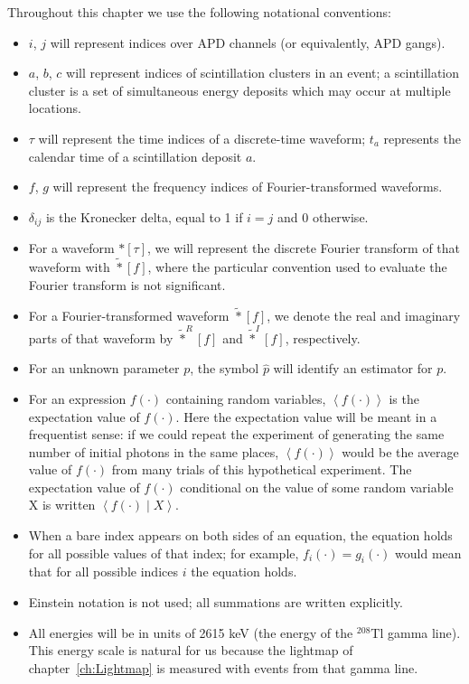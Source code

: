 Throughout this chapter we use the following notational conventions:
\begin{itemize}
\item $i$, $j$ will represent indices over APD channels (or equivalently, APD gangs).
\item $a$, $b$, $c$ will represent indices of scintillation clusters in an event; a scintillation cluster is a set of simultaneous energy deposits which may occur at multiple locations.
\item $\tau$ will represent the time indices of a discrete-time waveform; $t_a$ represents the calendar time of a scintillation deposit $a$.
\item $f$, $g$ will represent the frequency indices of Fourier-transformed waveforms.
\item $\delta_{ij}$ is the Kronecker delta, equal to 1 if $i = j$ and 0 otherwise.
\item For a waveform $*[\tau]$, we will represent the discrete Fourier transform of that waveform with $\widetilde{*}[f]$, where the particular convention used to evaluate the Fourier transform is not significant.
\item For a Fourier-transformed waveform $\widetilde{*}[f]$, we denote the real and imaginary parts of that waveform by $\widetilde{*}^R[f]$ and $\widetilde{*}^I[f]$, respectively.
\item For an unknown parameter $p$, the symbol $\widehat{p}$ will identify an estimator for $p$.
\item For an expression $f(\cdot)$ containing random variables, $\left<f(\cdot)\right>$ is the expectation value of $f(\cdot)$.  Here the expectation value will be meant in a frequentist sense: if we could repeat the experiment of generating the same number of initial photons in the same places, $\left<f(\cdot)\right>$ would be the average value of $f(\cdot)$ from many trials of this hypothetical experiment.  The expectation value of $f(\cdot)$ conditional on the value of some random variable X is written $\left<f(\cdot) \middle\vert X\right>$.
\item When a bare index appears on both sides of an equation, the equation holds for all possible values of that index; for example, $f_i(\cdot) = g_i(\cdot)$ would mean that for all possible indices $i$ the equation holds.
\item Einstein notation is not used; all summations are written explicitly.
\item All energies will be in units of 2615 keV (the energy of the $^{208}$Tl gamma line).  This energy scale is natural for us because the lightmap of chapter~\ref{ch:Lightmap} is measured with events from that gamma line.
\end{itemize}

